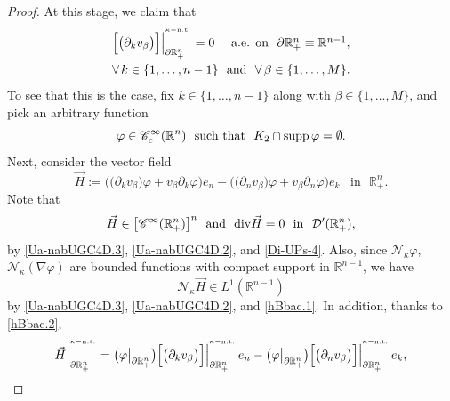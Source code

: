 \documentclass[11pt,reqno]{amsart}
\numberwithin{equation}{section}
\theoremstyle{remark}
\begin{document}
\begin{proof}
At this stage, we claim that 
%
\begin{equation}\label{Ua-nabUGC4D}
\begin{array}{c}
\Big[\big(\partial_k v_\beta\big)\Big]
\Big|_{\partial\mathbb{R}^{n}_{+}}^{{}^{\kappa-{\rm n.t.}}}=0
\quad\text{ a.e. on }\,\,\partial{\mathbb{R}}^n_{+}\equiv\mathbb{R}^{n-1},
\\[10pt]
\forall\,k\in\{1,\dots,n-1\}\,\,\text{ and }\,\,\forall\,\beta\in\{1,\dots,M\}.
\end{array}
\end{equation}
%
To see that this is the case, fix $k\in\{1,\dots,n-1\}$ along with 
$\beta\in\{1,\dots,M\}$, and pick an arbitrary function 
%
\begin{equation}\label{Ua-nabUGC4D.2}
\varphi\in{\mathscr{C}}^\infty_c({\mathbb{R}}^n)\,\,\text{ such that }\,\,
K_2\cap{\rm supp}\,\varphi=\emptyset. 
\end{equation}
%
Next, consider the vector field
%
\begin{equation}\label{Ua-nabUGC4D.3}
\vec{H}:=\Big(\big(\partial_k v_\beta\big)\varphi+v_\beta\partial_k\varphi\Big)e_n
-\Big(\big(\partial_n v_{\beta}\big)\varphi+v_{\beta}\partial_n\varphi\Big)e_k
\,\,\,\text{ in }\,\,{\mathbb{R}}^n_{+}.
\end{equation}
%
Note that 
%
\begin{equation}\label{Ua-nabUGC4D.4}
\vec{H}\in\big[{\mathscr{C}}^\infty({\mathbb{R}}^n_{+})\big]^n\,\,\text{ and }\,\,
{\rm div}\vec{H}=0\,\,\text{ in }\,\,{\mathcal{D}}'({\mathbb{R}}^n_{+}),
\end{equation}
%
by \eqref{Ua-nabUGC4D.3}, \eqref{Ua-nabUGC4D.2}, and \eqref{Di-UPs-4}. 
Also, since ${\mathcal{N}}_{\kappa}\varphi$, ${\mathcal{N}}_{\kappa}(\nabla\varphi)$ 
are bounded functions with compact support in ${\mathbb{R}}^{n-1}$, we have
%
\begin{equation}\label{Ua-nabUGC4D.5}
{\mathcal{N}}_{\kappa}\vec{H}\in L^1({\mathbb{R}}^{n-1})
\end{equation}
%
by \eqref{Ua-nabUGC4D.3}, \eqref{Ua-nabUGC4D.2}, and \eqref{hBbac.1}.
In addition, thanks to \eqref{hBbac.2}, 
%
\begin{equation}\label{Ua-nabUGC4D.6}
\vec{H}\Big|_{\partial\mathbb{R}^{n}_{+}}^{{}^{\kappa-{\rm n.t.}}}
=\big(\varphi\big|_{\partial\mathbb{R}^{n}_{+}}\big)
\Big[\big(\partial_k v_{\beta}\big)\Big]
\Big|_{\partial\mathbb{R}^{n}_{+}}^{{}^{\kappa-{\rm n.t.}}}\,e_n
-\big(\varphi\big|_{\partial\mathbb{R}^{n}_{+}}\big)
\Big[\big(\partial_n v_{\beta}\big)\Big]
\Big|_{\partial\mathbb{R}^{n}_{+}}^{{}^{\kappa-{\rm n.t.}}}\,e_k,

\end{equation}
\end{proof}
\end{document}
